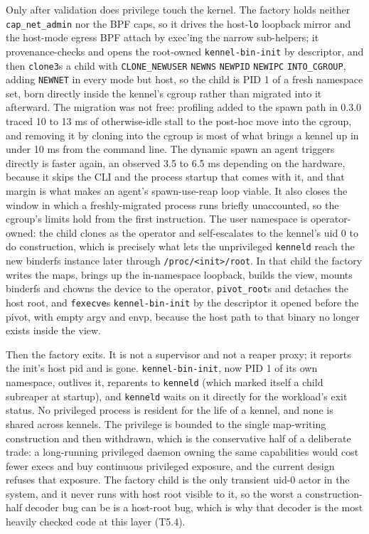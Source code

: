Only after validation does privilege touch the kernel. The factory holds
neither \texttt{cap\_net\_admin} nor the BPF caps, so it drives the
host-\texttt{lo} loopback mirror and the host-mode egress BPF attach by
exec'ing the narrow sub-helpers; it provenance-checks and opens the
root-owned \texttt{kennel-bin-init} by descriptor, and then
\texttt{clone3}s a child with \texttt{CLONE\_NEWUSER} \textbar{}
\texttt{NEWNS} \textbar{} \texttt{NEWPID} \textbar{} \texttt{NEWIPC}
\textbar{} \texttt{INTO\_CGROUP}, adding \texttt{NEWNET} in every mode
but host, so the child is PID 1 of a fresh namespace set, born directly
inside the kennel's cgroup rather than migrated into it afterward. The
migration was not free: profiling added to the spawn path in 0.3.0
traced 10 to 13 ms of otherwise-idle stall to the post-hoc move into the
cgroup, and removing it by cloning into the cgroup is most of what
brings a kennel up in under 10 ms from the command line. The dynamic
spawn an agent triggers directly is faster again, an observed 3.5 to 6.5
ms depending on the hardware, because it skips the CLI and the process
startup that comes with it, and that margin is what makes an agent's
spawn-use-reap loop viable. It also closes the window in which a
freshly-migrated process runs briefly unaccounted, so the cgroup's
limits hold from the first instruction. The user namespace is
operator-owned: the child clones as the operator and self-escalates to
the kennel's uid 0 to do construction, which is precisely what lets the
unprivileged \texttt{kenneld} reach the new binderfs instance later
through \texttt{/proc/\textless{}init\textgreater{}/root}. In that child
the factory writes the maps, brings up the in-namespace loopback, builds
the view, mounts binderfs and chowns the device to the operator,
\texttt{pivot\_root}s and detaches the host root, and \texttt{fexecve}s
\texttt{kennel-bin-init} by the descriptor it opened before the pivot,
with empty argv and envp, because the host path to that binary no longer
exists inside the view.

Then the factory exits. It is not a supervisor and not a reaper proxy;
it reports the init's host pid and is gone. \texttt{kennel-bin-init},
now PID 1 of its own namespace, outlives it, reparents to
\texttt{kenneld} (which marked itself a child subreaper at startup), and
\texttt{kenneld} waits on it directly for the workload's exit status. No
privileged process is resident for the life of a kennel, and none is
shared across kennels. The privilege is bounded to the single
map-writing construction and then withdrawn, which is the conservative
half of a deliberate trade: a long-running privileged daemon owning the
same capabilities would cost fewer execs and buy continuous privileged
exposure, and the current design refuses that exposure. The factory
child is the only transient uid-0 actor in the system, and it never runs
with host root visible to it, so the worst a construction-half decoder
bug can be is a host-root bug, which is why that decoder is the most
heavily checked code at this layer (T5.4).

